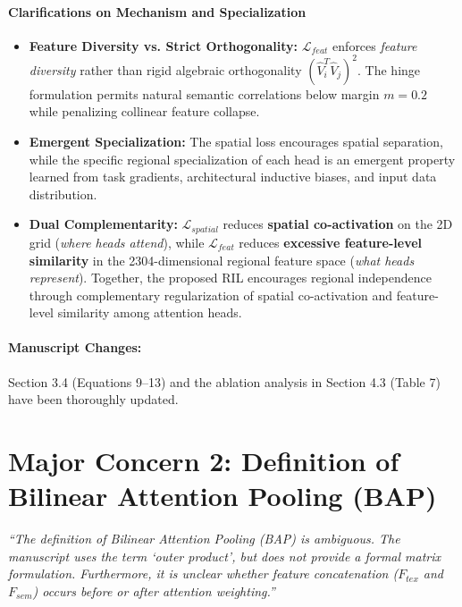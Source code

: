 \documentclass[runningheads]{llncs}
\begin{document}
\paragraph{Clarifications on Mechanism and Specialization}
\begin{itemize}
    \item \textbf{Feature Diversity vs. Strict Orthogonality:} $\mathcal{L}_{feat}$ enforces \textit{feature diversity} rather than rigid algebraic orthogonality $(\hat{V}_i^T \hat{V}_j)^2$. The hinge formulation permits natural semantic correlations below margin $m=0.2$ while penalizing collinear feature collapse.
    \item \textbf{Emergent Specialization:} The spatial loss encourages spatial separation, while the specific regional specialization of each head is an emergent property learned from task gradients, architectural inductive biases, and input data distribution.
    \item \textbf{Dual Complementarity:} $\mathcal{L}_{spatial}$ reduces \textbf{spatial co-activation} on the 2D grid (\textit{where heads attend}), while $\mathcal{L}_{feat}$ reduces \textbf{excessive feature-level similarity} in the 2304-dimensional regional feature space (\textit{what heads represent}). Together, the proposed RIL encourages regional independence through complementary regularization of spatial co-activation and feature-level similarity among attention heads.
\end{itemize}

\paragraph{Manuscript Changes:} Section 3.4 (Equations 9--13) and the ablation analysis in Section 4.3 (Table 7) have been thoroughly updated.

\bigskip

\section*{Major Concern 2: Definition of Bilinear Attention Pooling (BAP)}

\begin{tcolorbox}[colback=gray!10,colframe=gray!50,title=\textbf{Reviewer Comment 2}]
\textit{``The definition of Bilinear Attention Pooling (BAP) is ambiguous. The manuscript uses the term `outer product', but does not provide a formal matrix formulation. Furthermore, it is unclear whether feature concatenation ($F_{tex}$ and $F_{sem}$) occurs before or after attention weighting.''}
\end{tcolorbox}
\end{document}

